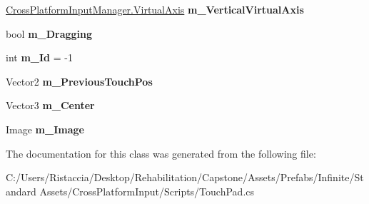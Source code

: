 \begin{DoxyCompactItemize}
\hyperlink{class_unity_standard_assets_1_1_cross_platform_input_1_1_cross_platform_input_manager_1_1_virtual_axis}{Cross\+Platform\+Input\+Manager.\+Virtual\+Axis} {\bfseries m\+\_\+\+Vertical\+Virtual\+Axis}
\item 
\mbox{\label{class_unity_standard_assets_1_1_cross_platform_input_1_1_touch_pad_afd54a6f576c97542eb7bc438cac5b886}} 
bool {\bfseries m\+\_\+\+Dragging}
\item 
\mbox{\label{class_unity_standard_assets_1_1_cross_platform_input_1_1_touch_pad_ac4bc67fbdd5a2a5f38cd31982c2a38bf}} 
int {\bfseries m\+\_\+\+Id} = -\/1
\item 
\mbox{\label{class_unity_standard_assets_1_1_cross_platform_input_1_1_touch_pad_a263a40587ae1d4dbed0b1bd90b97fd9b}} 
Vector2 {\bfseries m\+\_\+\+Previous\+Touch\+Pos}
\item 
\mbox{\label{class_unity_standard_assets_1_1_cross_platform_input_1_1_touch_pad_abb84b52075a036bba75ca37b5effbe8a}} 
Vector3 {\bfseries m\+\_\+\+Center}
\item 
\mbox{\label{class_unity_standard_assets_1_1_cross_platform_input_1_1_touch_pad_ae92e887afafaba0bcdcdd03f276794f2}} 
Image {\bfseries m\+\_\+\+Image}
\end{DoxyCompactItemize}


The documentation for this class was generated from the following file\+:\begin{DoxyCompactItemize}
\item 
C\+:/\+Users/\+Ristaccia/\+Desktop/\+Rehabilitation/\+Capstone/\+Assets/\+Prefabs/\+Infinite/\+Standard Assets/\+Cross\+Platform\+Input/\+Scripts/Touch\+Pad.\+cs\end{DoxyCompactItemize}
